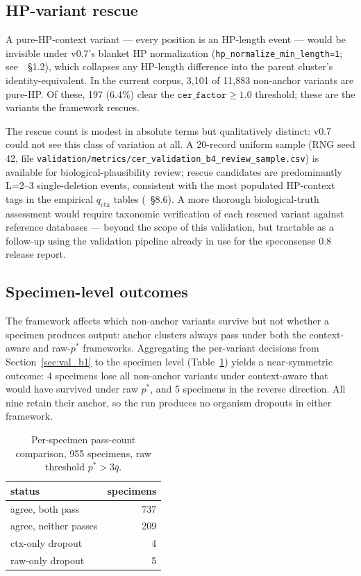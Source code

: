 \documentclass[11pt]{article}
\begin{document}
\subsection{HP-variant rescue}
\label{sec:val_b4}

A pure-HP-context variant — every position is an HP-length event — would
be invisible under v0.7's blanket HP normalization
(\texttt{hp\_normalize\_min\_length=1}; see~\cite{hp_paper}~\S 1.2),
which collapses any HP-length difference into the parent cluster's
identity-equivalent. In the current corpus, 3{,}101 of 11{,}883 non-anchor
variants are pure-HP. Of these, 197 (6.4\%) clear the
$\texttt{cer\_factor} \geq 1.0$ threshold; these are the variants the
framework rescues.

The rescue count is modest in absolute terms but qualitatively distinct:
v0.7 could not see this class of variation at all. A 20-record uniform
sample (RNG seed 42, file
\texttt{validation/metrics/cer\_validation\_b4\_review\_sample.csv}) is
available for biological-plausibility review; rescue candidates are
predominantly L=2--3 single-deletion events, consistent with the most
populated HP-context tags in the empirical $q_\text{ctx}$ tables
(\cite{hp_paper}~\S 8.6). A more thorough biological-truth assessment would
require taxonomic verification of each rescued variant against reference
databases — beyond the scope of this validation, but tractable as a
follow-up using the validation pipeline already in use for the speconsense
0.8 release report.

\subsection{Specimen-level outcomes}
\label{sec:val_b5}

The framework affects which non-anchor variants survive but not whether a
specimen produces output: anchor clusters always pass under both the
context-aware and raw-$p^*$ frameworks. Aggregating the per-variant
decisions from Section~\ref{sec:val_b1} to the specimen level
(Table~\ref{tab:val_dropouts}) yields a near-symmetric outcome: 4 specimens
lose all non-anchor variants under context-aware that would have survived
under raw $p^*$, and 5 specimens in the reverse direction. All nine retain
their anchor, so the run produces no organism dropouts in either framework.

\begin{table}[h]
\centering
\caption{Per-specimen pass-count comparison, 955 specimens, raw threshold
$p^* > 3\bar{q}$.}
\label{tab:val_dropouts}
\begin{tabular}{l r}
\toprule
status                  & specimens \\
\midrule
agree, both pass        & 737 \\
agree, neither passes   & 209 \\
ctx-only dropout        & 4 \\
raw-only dropout        & 5 \\
\bottomrule
\end{tabular}
\end{table}
\end{document}

